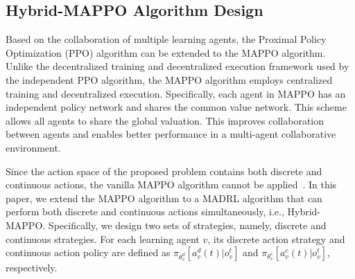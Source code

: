 \documentclass[lettersize,journal]{IEEEtran}
\begin{document}
\subsection{Hybrid-MAPPO Algorithm Design}
Based on the collaboration of multiple learning agents, the Proximal Policy Optimization (PPO) algorithm can be extended to the MAPPO algorithm. Unlike the decentralized training and decentralized execution framework used by the independent PPO algorithm, the MAPPO algorithm employs centralized training and decentralized execution. Specifically, each agent in MAPPO has an independent policy network and shares the common value network. This scheme allows all agents to share the global valuation. This improves collaboration between agents and enables better performance in a multi-agent collaborative environment.

Since the action space of the proposed problem contains both discrete and continuous actions, the vanilla MAPPO algorithm cannot be applied~\cite{qiu2023hierarchical}. In this paper, we extend the MAPPO algorithm to a MADRL algorithm that can perform both discrete and continuous actions simultaneously, i.e., Hybrid-MAPPO. Specifically, we design two sets of strategies, namely, discrete and continuous strategies. For each learning agent $v$, its discrete action strategy and continuous action policy are defined as $\pi_{\theta_v^d}[a_v^d(t)|o_v^t]$ and $\pi_{\theta_v^c}[a_v^c(t)|o_v^t]$, respectively. 
\end{document}
